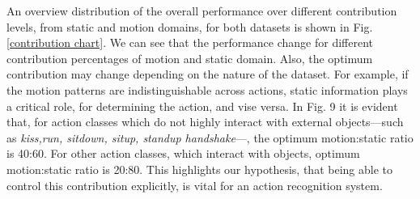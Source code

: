 An overview distribution of the overall performance over different contribution levels, from static and motion domains, for both datasets is shown in Fig. \ref{contribution chart}.
We can see that the performance change for different contribution percentages of motion and static domain. Also, the optimum contribution may change
depending on the nature of the dataset. For example, if the motion patterns are indistinguishable across actions, static information plays
a critical role, for determining the action, and vise versa. 
In Fig. 9 it is evident that, for action classes which do not highly interact with external objects---such as \emph{kiss,run, sitdown, situp, standup
handshake}---, the optimum motion:static ratio is 40:60. For other action classes, which interact with objects, optimum motion:static ratio is 20:80. This highlights our hypothesis, that being able to control this contribution explicitly, is vital for an action recognition system.


\mydata


